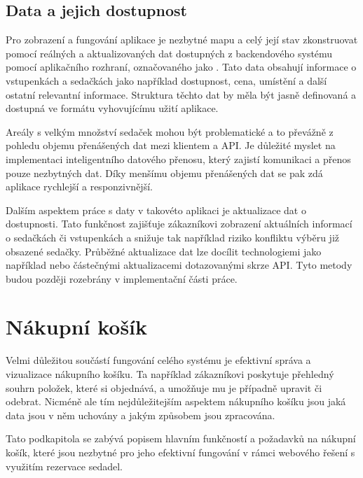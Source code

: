 \subsection{Data a jejich dostupnost}
\label{subsec:specifikace-interaktivni-mapa-data-a-dostupnost}
Pro zobrazení a fungování aplikace je nezbytné mapu a celý její stav zkonstruovat pomocí reálných a aktualizovaných dat dostupných z backendového systému pomocí aplikačního rozhraní, označovaného jako .
Tato data obsahují informace o vstupenkách a sedačkách jako například dostupnost, cena, umístění a další ostatní relevantní informace.
Struktura těchto dat by měla být jasně definovaná a dostupná ve formátu vyhovujícímu užití aplikace.

Areály s velkým množství sedaček mohou být problematické a to převážně z pohledu objemu přenášených dat mezi klientem a API\@.
Je důležité myslet na implementaci inteligentního datového přenosu, který zajistí komunikaci a přenos pouze nezbytných dat.
Díky menšímu objemu přenášených dat se pak zdá aplikace rychlejší a responzivnější.

Dalším aspektem práce s daty v takovéto aplikaci je aktualizace dat o dostupnosti.
Tato funkčnost zajišťuje zákazníkovi zobrazení aktuálních informací o sedačkách či vstupenkách a snižuje tak například riziko konfliktu výběru již obsazené sedačky.
Průběžné aktualizace dat lze docílit technologiemi jako například  nebo částečnými aktualizacemi dotazovanými skrze API\@.
Tyto metody budou později rozebrány v implementační části práce.


\section{Nákupní košík}
\label{sec:specifikace-nakupni-kosik}
Velmi důležitou součástí fungování celého systému je efektivní správa a vizualizace nákupního košíku.
Ta například zákazníkovi poskytuje přehledný souhrn položek, které si objednává, a umožňuje mu je případně upravit či odebrat.
Nicméně ale tím nejdůležitejším aspektem nákupního košíku jsou jaká data jsou v něm uchovány a jakým způsobem jsou zpracována.

Tato podkapitola se zabývá popisem hlavním funkčností a požadavků na nákupní košík, které jsou nezbytné pro jeho efektivní fungování v rámci webového řešení s využitím rezervace sedadel.

